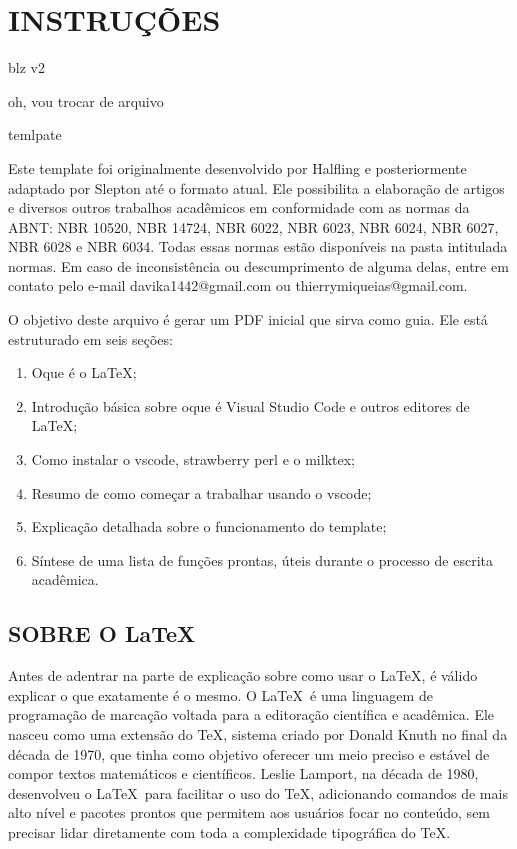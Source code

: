\section{INSTRUÇÕES}

blz v2

oh, vou trocar de arquivo

temlpate

Este template foi originalmente desenvolvido por Halfling e posteriormente adaptado por Slepton até o formato atual. Ele possibilita a elaboração de artigos e diversos outros trabalhos acadêmicos em conformidade com as normas da ABNT: NBR 10520, NBR 14724, NBR 6022, NBR 6023, NBR 6024, NBR 6027, NBR 6028 e NBR 6034. Todas essas normas estão disponíveis na pasta intitulada normas. Em caso de inconsistência ou descumprimento de alguma delas, entre em contato pelo e-mail davika1442@gmail.com ou thierrymiqueias@gmail.com.

O objetivo deste arquivo é gerar um PDF inicial que sirva como guia. Ele está estruturado em seis seções:

\begin{enumerate}

\item Oque é o \LaTeX;

\item Introdução básica sobre oque é Visual Studio Code e outros editores de \LaTeX;

\item Como instalar o vscode, strawberry perl e o milktex;

\item Resumo de como começar a trabalhar usando o vscode;
  
\item Explicação detalhada sobre o funcionamento do template;

\item Síntese de uma lista de funções prontas, úteis durante o processo de escrita acadêmica.

\end{enumerate}

\subsection{SOBRE O \LaTeX}

Antes de adentrar na parte de explicação sobre como usar o \LaTeX, é válido explicar o que exatamente é o mesmo. O \LaTeX \ é uma linguagem de programação de marcação voltada para a editoração científica e acadêmica. Ele nasceu como uma extensão do TeX, sistema criado por Donald Knuth no final da década de 1970, que tinha como objetivo oferecer um meio preciso e estável de compor textos matemáticos e científicos. Leslie Lamport, na década de 1980, desenvolveu o \LaTeX \ para facilitar o uso do TeX, adicionando comandos de mais alto nível e pacotes prontos que permitem aos usuários focar no conteúdo, sem precisar lidar diretamente com toda a complexidade tipográfica do TeX.

